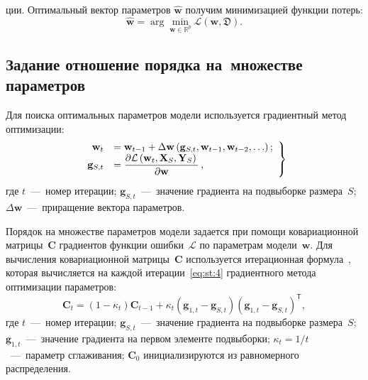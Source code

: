 \begin{multicols}{2}
\noindent
ции.
Оптимальный вектор параметров $\hat{\mathbf{w}}$ получим минимизацией 
функции потерь:
\begin{equation*}
\hat{\mathbf{w}} = \arg \min\limits_{\mathbf{w}\in\mathbb{R}^{p}} 
\mathcal{L}\left(\mathbf{w}, \mathfrak{D}\right).
\end{equation*}

 \subsection{Задание отношение порядка на~множестве параметров}

Для поиска оптимальных параметров модели используется градиентный метод 
оптимизации:
\begin{equation}
\label{eq:st:4}
\left.\begin{array}{rl}
\mathbf{w}_{t} &= \mathbf{w}_{t-1} + 
\Delta\mathbf{w}\left(\mathbf{g}_{S,t}, \mathbf{w}_{t-1}, \mathbf{w}_{t-
2}, \ldots\right); \\
\mathbf{g}_{S,t}&=\displaystyle\frac{\displaystyle \partial 
\mathcal{L}\left(\mathbf{w}_{t}, \mathbf{X}_{S}, 
\mathbf{Y}_{S}\right)\mathstrut}{\displaystyle \partial \mathbf{w}\mathstrut}\,,
\end{array}
\right\}
\end{equation}
где $t$~---~номер итерации; $\mathbf{g}_{S,t}$~---~значение градиента на 
подвыборке размера~$S$;  
$\Delta\mathbf{w}$~---~приращение вектора параметров.


Порядок на множестве параметров модели задается при помощи ковариационной 
матрицы~$\mathbf{C}$ градиентов функции ошибки~$\mathcal{L}$ по 
параметрам модели~$\mathbf{w}$. Для вычисления ковариационной 
матрицы~$\mathbf{C}$ используется итерационная 
формула~\cite{Chunyan2016}, которая вычисляется на каждой 
итерации~\eqref{eq:st:4} градиентного метода оптимизации параметров:
\begin{equation*}
\mathbf{C}_t = \left(1-\kappa_t\right)\mathbf{C}_{t-1}+
\kappa_t\left(\mathbf{g}_{1,t}-
\mathbf{g}_{S,t}\right)\left(\mathbf{g}_{1,t}-
\mathbf{g}_{S,t}\right)^{\mathsf{T}},
\end{equation*}
 где $t$~---~номер итерации; $\mathbf{g}_{S,t}$~---~значение градиента на 
подвыборке размера~$S$;  
$\mathbf{g}_{1,t}$~---~значение градиента на первом элементе подвыборки; 
$\kappa_t={1}/{t}$~---~параметр сглаживания; $\mathbf{C}_0$ 
инициализируются из равномерного распределения.


\end{multicols}
